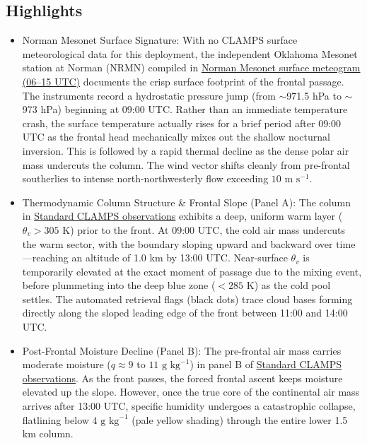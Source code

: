 \documentclass[11pt]{article}
\begin{document}
\subsection*{Highlights}
\begin{itemize}
  \item Norman Mesonet Surface Signature: With no CLAMPS surface meteorological data for this deployment, the independent Oklahoma Mesonet station at Norman (NRMN) compiled in \hyperref[fig:fropa_c2:fropa_c2_aux_surface_meteogram]{Norman Mesonet surface meteogram (06–15 UTC)} documents the crisp surface footprint of the frontal passage. The instruments record a hydrostatic pressure jump (from $\sim$971.5 hPa to $\sim$973 hPa) beginning at 09:00 UTC. Rather than an immediate temperature crash, the surface temperature actually rises for a brief period after 09:00 UTC as the frontal head mechanically mixes out the shallow nocturnal inversion. This is followed by a rapid thermal decline as the dense polar air mass undercuts the column. The wind vector shifts cleanly from pre-frontal southerlies to intense north-northwesterly flow exceeding $10\text{ m s}^{-1}$.
  \item Thermodynamic Column Structure \& Frontal Slope (Panel A): The column in \hyperref[fig:fropa_c2:fropa_c2_instrument_template_4panel]{Standard CLAMPS observations} exhibits a deep, uniform warm layer ($\theta_v > 305\text{ K}$) prior to the front. At 09:00 UTC, the cold air mass undercuts the warm sector, with the boundary sloping upward and backward over time—reaching an altitude of 1.0 km by 13:00 UTC. Near-surface $\theta_v$ is temporarily elevated at the exact moment of passage due to the mixing event, before plummeting into the deep blue zone ($< 285\text{ K}$) as the cold pool settles. The automated retrieval flags (black dots) trace cloud bases forming directly along the sloped leading edge of the front between 11:00 and 14:00 UTC.
  \item Post-Frontal Moisture Decline (Panel B): The pre-frontal air mass carries moderate moisture ($q \approx 9\text{ to }11\text{ g kg}^{-1}$) in panel B of \hyperref[fig:fropa_c2:fropa_c2_instrument_template_4panel]{Standard CLAMPS observations}. As the front passes, the forced frontal ascent keeps moisture elevated up the slope. However, once the true core of the continental air mass arrives after 13:00 UTC, specific humidity undergoes a catastrophic collapse, flatlining below $4\text{ g kg}^{-1}$ (pale yellow shading) through the entire lower 1.5 km column.

\end{itemize}
\end{document}
